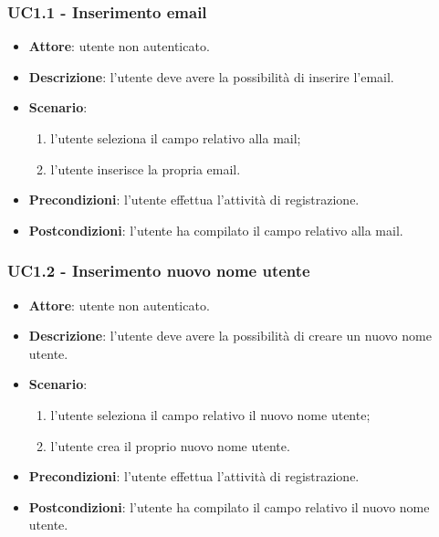 \subsubsection{UC1.1 - Inserimento email}
\begin{itemize}
    \item \textbf{Attore}: utente non autenticato.
    \item \textbf{Descrizione}: l'utente deve avere la possibilità di inserire l'email.
    \item \textbf{Scenario}:
    \begin{enumerate}
        \item l'utente seleziona il campo relativo alla mail;
        \item l'utente inserisce la propria email.
    \end{enumerate}

    \item \textbf{Precondizioni}: l'utente effettua l'attività di registrazione.
    \item \textbf{Postcondizioni}: l'utente ha compilato il campo relativo alla mail.
\end{itemize}

\subsubsection{UC1.2 - Inserimento nuovo nome utente}
\begin{itemize}
    \item \textbf{Attore}: utente non autenticato.
    \item \textbf{Descrizione}: l'utente deve avere la possibilità di creare un nuovo nome utente.
    \item \textbf{Scenario}:
    \begin{enumerate}
        \item l'utente seleziona il campo relativo il nuovo nome utente;
        \item l'utente crea il proprio nuovo nome utente.
    \end{enumerate}
    \item \textbf{Precondizioni}: l'utente effettua l'attività di registrazione.
    \item \textbf{Postcondizioni}: l'utente ha compilato il campo relativo il nuovo nome utente.
\end{itemize}

